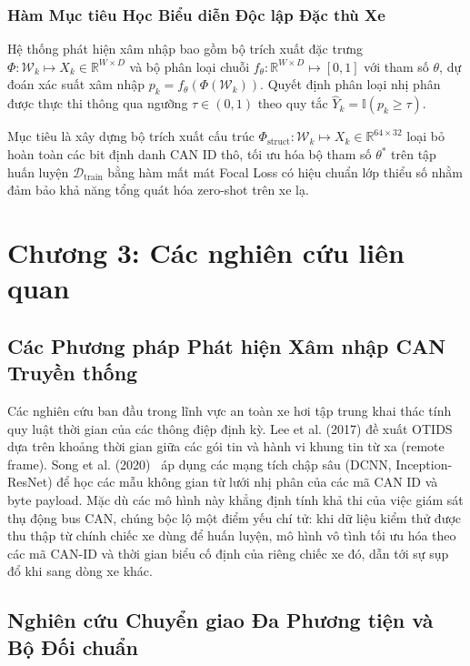 \documentclass[12pt, a4paper, reqno, oneside]{book}
\begin{document}
\subsection{Hàm Mục tiêu Học Biểu diễn Độc lập Đặc thù Xe}
Hệ thống phát hiện xâm nhập bao gồm bộ trích xuất đặc trưng $\Phi: \mathcal{W}_k \mapsto X_k \in \mathbb{R}^{W \times D}$ và bộ phân loại chuỗi $f_{\theta}: \mathbb{R}^{W \times D} \mapsto [0, 1]$ với tham số $\theta$, dự đoán xác suất xâm nhập $p_k = f_{\theta}(\Phi(\mathcal{W}_k))$. Quyết định phân loại nhị phân được thực thi thông qua ngưỡng $\tau \in (0, 1)$ theo quy tắc $\hat{Y}_k = \mathbb{I}(p_k \ge \tau)$.

Mục tiêu là xây dựng bộ trích xuất cấu trúc $\Phi_{\text{struct}}: \mathcal{W}_k \mapsto X_k \in \mathbb{R}^{64 \times 32}$ loại bỏ hoàn toàn các bit định danh CAN ID thô, tối ưu hóa bộ tham số $\theta^*$ trên tập huấn luyện $\mathcal{D}_{\text{train}}$ bằng hàm mất mát Focal Loss có hiệu chuẩn lớp thiểu số nhằm đảm bảo khả năng tổng quát hóa zero-shot trên xe lạ.

\chapter{Chương 3: Các nghiên cứu liên quan}
\label{chap:related}

\section{Các Phương pháp Phát hiện Xâm nhập CAN Truyền thống}
\label{sec:rw_conventional}

Các nghiên cứu ban đầu trong lĩnh vực an toàn xe hơi tập trung khai thác tính quy luật thời gian của các thông điệp định kỳ. Lee et al. (2017) đề xuất OTIDS~\cite{lee2017otids} dựa trên khoảng thời gian giữa các gói tin và hành vi khung tin từ xa (remote frame). Song et al. (2020)~\cite{song2020invehicle,song2020dcnn} áp dụng các mạng tích chập sâu (DCNN, Inception-ResNet) để học các mẫu không gian từ lưới nhị phân của các mã CAN ID và byte payload. Mặc dù các mô hình này khẳng định tính khả thi của việc giám sát thụ động bus CAN, chúng bộc lộ một điểm yếu chí tử: khi dữ liệu kiểm thử được thu thập từ chính chiếc xe dùng để huấn luyện, mô hình vô tình tối ưu hóa theo các mã CAN-ID và thời gian biểu cố định của riêng chiếc xe đó, dẫn tới sự sụp đổ khi sang dòng xe khác.

\section{Nghiên cứu Chuyển giao Đa Phương tiện và Bộ Đối chuẩn}
\label{sec:rw_transfer}
\end{document}
